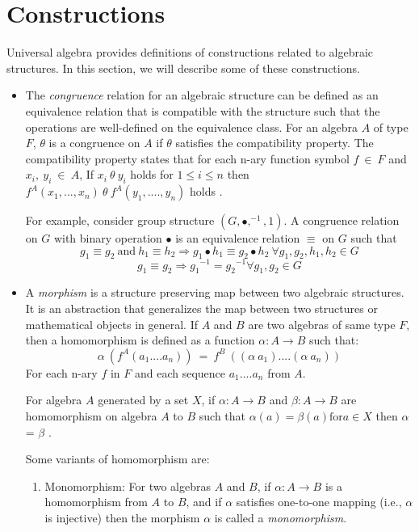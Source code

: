\section{Constructions}
Universal algebra provides definitions of constructions related to algebraic
structures. In this section, we will describe some of these constructions. 
\begin{itemize}
    \item The \textit{congruence} relation for an algebraic structure can be
    defined as an equivalence relation that is compatible with the structure
    such that the operations are well-defined on the equivalence class. For an
    algebra $A$ of type $F$, $\theta$ is a congruence on $A$ if $\theta$
    satisfies the compatibility property. The compatibility property states that
    for each n-ary function symbol $f \ \in\ F$ and $x_i,\ y_i\ \in\ A$, If
    $x_i\ \theta\ y_i$ holds for \(1\leq i \leq n\) then $f^{A}(x_1,...,x_n)\
    \theta\ f^{A}(y_1,....,y_n)$ holds \cite{sankappanavar1981course}.

    For example, consider group structure $(G, ∙, ^{-1}, 1)$. A
    congruence relation on $G$ with binary operation $∙$ is an equivalence
    relation $\equiv$ on $G$ such that \[g_1\equiv g_2\ \text{and}\ h_1 \equiv h_2
    \Rightarrow g_1 ∙ h_1 \equiv g_2 ∙ h_2\ \forall g_1,g_2,h_1,h_2 \in G\] 
    \[g_1 \equiv g_2 \Rightarrow {g_1}^{-1} = {g_2}^{-1}
    \forall g_1,g_2 \in G\]

    \item A \textit{morphism} is a structure preserving map between two
    algebraic structures. It is an abstraction that generalizes the map between
    two structures or mathematical objects in general. If $A$ and $B$ are two
    algebras of same type $F$, then a homomorphism is defined as a function
    $\alpha: A \rightarrow B$ such that: \[ \alpha\ (f^{A}(a_1....a_n))\ =\
    f^{B}\ ((\alpha\ a_1)....(\alpha\ a_n))\] For each n-ary $f$ in $F$ and
    each sequence $a_1....a_n$ from $A$.
   
    For algebra $A$ generated by a set $X$, if \(\alpha: A \rightarrow B\) and
    \(\beta: A \rightarrow B\) are homomorphism on algebra $A$ to $B$ such that
    \(\alpha (a) = \beta (a) \text{for} a \in X\) then \(\alpha\) = \(\beta\)
    \cite{sankappanavar1981course}.

    Some variants of homomorphism are:
    \begin{enumerate}
        \item  Monomorphism: For two algebras $A$ and $B$, if \(\alpha : A
        \rightarrow B \) is a homomorphism from $A$ to $B$, and if \(\alpha\)
        satisfies one-to-one mapping (i.e., \(\alpha\) is injective) then the
        morphism \(\alpha\) is called a \textit{monomorphism}.


\end{enumerate}
\end{itemize}
